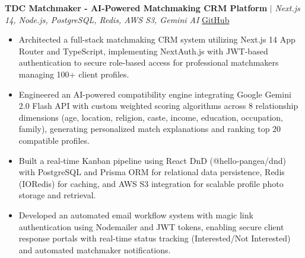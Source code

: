 
\textbf{TDC Matchmaker - AI-Powered Matchmaking CRM Platform} $|$ \textit{Next.js 14, Node.js, PostgreSQL, Redis, AWS S3, Gemini AI} \hfill \href{https://github.com/Sarvang18/Matchmaker}{GitHub}
\vspace{-4pt}
\begin{itemize}[leftmargin=0.15in, itemsep=-2pt]\small
\item Architected a full-stack matchmaking CRM system utilizing Next.js 14 App Router and TypeScript, implementing NextAuth.js with JWT-based authentication to secure role-based access for professional matchmakers managing 100+ client profiles.
\item Engineered an AI-powered compatibility engine integrating Google Gemini 2.0 Flash API with custom weighted scoring algorithms across 8 relationship dimensions (age, location, religion, caste, income, education, occupation, family), generating personalized match explanations and ranking top 20 compatible profiles.
\item Built a real-time Kanban pipeline using React DnD (@hello-pangea/dnd) with PostgreSQL and Prisma ORM for relational data persistence, Redis (IORedis) for caching, and AWS S3 integration for scalable profile photo storage and retrieval.
\item Developed an automated email workflow system with magic link authentication using Nodemailer and JWT tokens, enabling secure client response portals with real-time status tracking (Interested/Not Interested) and automated matchmaker notifications.
\end{itemize}


